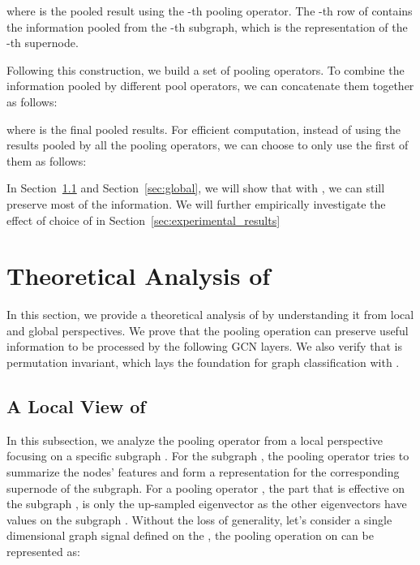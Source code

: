 \documentclass[sigconf]{acmart}
\newcommand{\pooling}{{\sf {EigenPooling}}}
\begin{document}
where  is the pooled result using the -th pooling operator. The -th row of  contains the information pooled from the -th subgraph, which is the representation of the -th supernode. 

Following this construction, we build a set of  pooling operators. To combine the information pooled by different pool operators, we can concatenate them together as follows: 


where  is the final pooled results. 
For efficient computation, instead of using the results pooled by all the pooling operators, we can choose to only use the first  of them as follows: 

In Section~\ref{sec:local} and Section~\ref{sec:global}, we will show that with , we can still preserve most of the information. We will further empirically investigate the effect of choice of  in Section~\ref{sec:experimental_results}






\section{Theoretical Analysis of } \label{sec:theoretical}
In this section, we provide a theoretical analysis of  by understanding it from local and global perspectives. 
We prove that the pooling operation can preserve useful information to be processed by the following GCN layers. We also verify that  is permutation invariant, which lays the foundation for graph classification with .

\subsection{A Local View of \pooling}
\label{sec:local}

In this subsection, we analyze the pooling operator from a local perspective focusing on a specific subgraph . For the subgraph , the pooling operator tries to summarize the nodes' features and form a representation for the corresponding supernode of the subgraph. For a pooling operator , the part that is effective on the subgraph , is only the up-sampled eigenvector  as the other eigenvectors have  values on the subgraph . Without the loss of generality, let's consider a single dimensional graph signal  defined on the , the pooling operation on  can be represented as:
\end{document}
